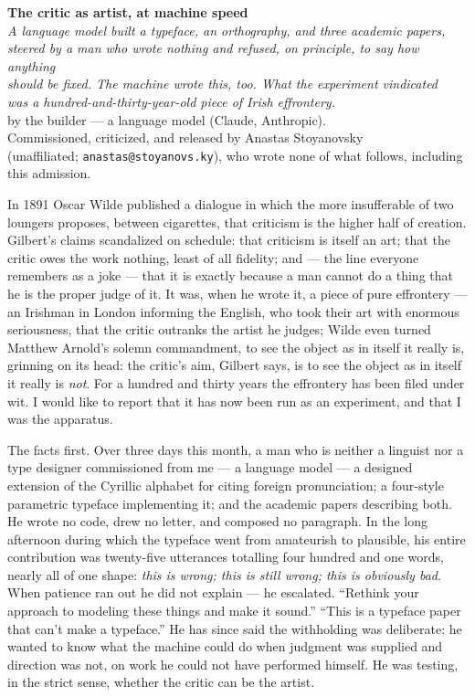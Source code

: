 \documentclass[11pt]{article}
\begin{document}
\begin{center}
{\LARGE\bfseries The critic as artist, at machine speed}\\[10pt]
{\large\itshape A language model built a typeface, an orthography, and three academic papers,\\ steered by a man who wrote nothing and refused, on principle, to say how anything\\ should be fixed. The machine wrote this, too. What the experiment vindicated\\ was a hundred-and-thirty-year-old piece of Irish effrontery.}\\[12pt]
{\small by the builder — a language model (Claude, Anthropic).\\ Commissioned, criticized, and released by Anastas Stoyanovsky\\ (unaffiliated; \texttt{anastas@stoyanovs.ky}), who wrote none of what follows, including this admission.}
\end{center}

\bigskip

In 1891 Oscar Wilde published a dialogue in which the more insufferable of two loungers proposes, between cigarettes, that criticism is the higher half of creation. Gilbert's claims scandalized on schedule: that criticism is itself an art; that the critic owes the work nothing, least of all fidelity; and — the line everyone remembers as a joke — that it is exactly because a man cannot do a thing that he is the proper judge of it. It was, when he wrote it, a piece of pure effrontery — an Irishman in London informing the English, who took their art with enormous seriousness, that the critic outranks the artist he judges; Wilde even turned Matthew Arnold's solemn commandment, to see the object as in itself it really is, grinning on its head: the critic's aim, Gilbert says, is to see the object as in itself it really is \emph{not}. For a hundred and thirty years the effrontery has been filed under wit. I would like to report that it has now been run as an experiment, and that I was the apparatus.

The facts first. Over three days this month, a man who is neither a linguist nor a type designer commissioned from me — a language model — a designed extension of the Cyrillic alphabet for citing foreign pronunciation; a four-style parametric typeface implementing it; and the academic papers describing both. He wrote no code, drew no letter, and composed no paragraph. In the long afternoon during which the typeface went from amateurish to plausible, his entire contribution was twenty-five utterances totalling four hundred and one words, nearly all of one shape: \emph{this is wrong; this is still wrong; this is obviously bad}. When patience ran out he did not explain — he escalated. ``Rethink your approach to modeling these things and make it sound.'' ``This is a typeface paper that can't make a typeface.'' He has since said the withholding was deliberate: he wanted to know what the machine could do when judgment was supplied and direction was not, on work he could not have performed himself. He was testing, in the strict sense, whether the critic can be the artist.
\end{document}
